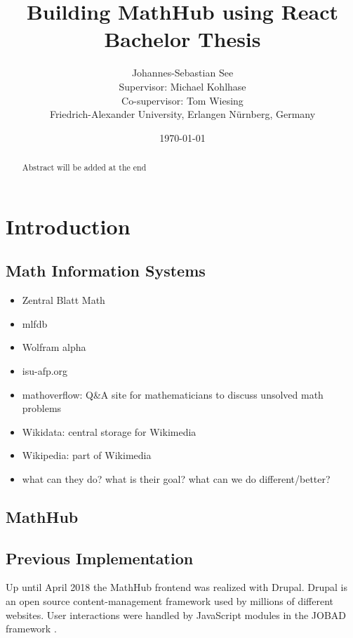\documentclass[11pt,a4paper]{article}
\title{Building MathHub using React\\ \vspace{2 mm} Bachelor Thesis}
\author{Johannes-Sebastian See\\Supervisor: Michael Kohlhase\\Co-supervisor: Tom Wiesing\\Friedrich-Alexander University, Erlangen Nürnberg, Germany}
\date{\today}
\begin{document}
\begin{titlepage}
\maketitle
\begin{abstract}
Abstract will be added at the end
\end{abstract}

\end{titlepage}

\tableofcontents
\section{Introduction}
\subsection{Math Information Systems}
\begin{itemize}
\item Zentral Blatt Math
\item mlfdb
\item Wolfram alpha
\item isu-afp.org
\item mathoverflow: Q{\&}A site for mathematicians to discuss unsolved math problems
\item Wikidata: central storage for Wikimedia
\item Wikipedia: part of Wikimedia
\item what can they do? what is their goal? what can we do different/better?
\end{itemize}
\subsection{MathHub}
\subsection{Previous Implementation}
Up until April 2018 the MathHub frontend was realized with Drupal.
Drupal is an open source content-management framework used by millions of different websites.
User interactions were handled by JavaScript modules in the JOBAD framework \cite{comp}.
	
\end{document}

